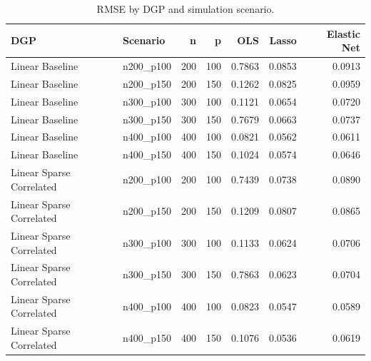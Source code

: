 \begin{table}[!htbp]
\centering
\caption{RMSE by DGP and simulation scenario.}
\label{tab:rmse-by-dgp}
\begin{tabular}{l l r r r r r}
 \hline
DGP & Scenario & n & p & OLS & Lasso & Elastic Net \\
 \hline
Linear Baseline & n200\_p100 & 200 & 100 & 0.7863 & 0.0853 & 0.0913 \\
Linear Baseline & n200\_p150 & 200 & 150 & 0.1262 & 0.0825 & 0.0959 \\
Linear Baseline & n300\_p100 & 300 & 100 & 0.1121 & 0.0654 & 0.0720 \\
Linear Baseline & n300\_p150 & 300 & 150 & 0.7679 & 0.0663 & 0.0737 \\
Linear Baseline & n400\_p100 & 400 & 100 & 0.0821 & 0.0562 & 0.0611 \\
Linear Baseline & n400\_p150 & 400 & 150 & 0.1024 & 0.0574 & 0.0646 \\
Linear Sparse Correlated & n200\_p100 & 200 & 100 & 0.7439 & 0.0738 & 0.0890 \\
Linear Sparse Correlated & n200\_p150 & 200 & 150 & 0.1209 & 0.0807 & 0.0865 \\
Linear Sparse Correlated & n300\_p100 & 300 & 100 & 0.1133 & 0.0624 & 0.0706 \\
Linear Sparse Correlated & n300\_p150 & 300 & 150 & 0.7863 & 0.0623 & 0.0704 \\
Linear Sparse Correlated & n400\_p100 & 400 & 100 & 0.0823 & 0.0547 & 0.0589 \\
Linear Sparse Correlated & n400\_p150 & 400 & 150 & 0.1076 & 0.0536 & 0.0619 \\
 \hline
\end{tabular}
\end{table}



